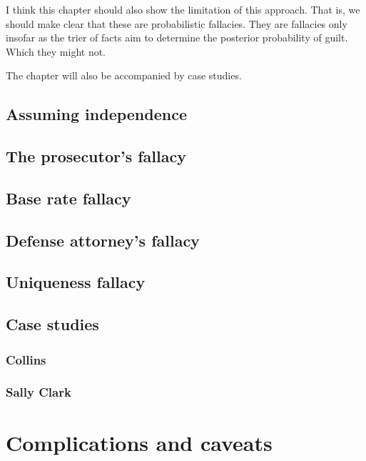 \documentclass[]{book}
\begin{document}
I think this chapter should also show the limitation
of this approach. That is, we should make clear that these
are probabilistic fallacies. They are fallacies only insofar as the trier of facts
aim to determine the posterior probability of guilt. Which they might not.

The chapter will also be accompanied
by case studies.

\section{Assuming independence}

\section{The prosecutor's fallacy}

\section{Base rate fallacy}

\section{Defense attorney's fallacy}

\section{Uniqueness fallacy}

\section{Case studies}

\subsection{Collins}

\subsection{Sally Clark}

\chapter{Complications and caveats}

\end{document}
